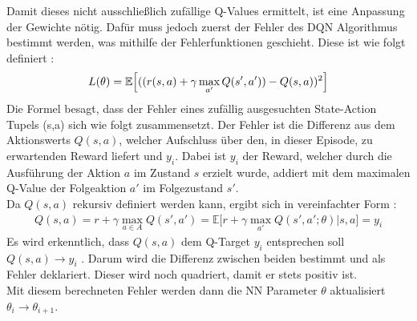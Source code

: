 Damit dieses nicht ausschließlich zufällige Q-Values ermittelt, ist eine Anpassung der Gewichte nötig. Dafür muss jedoch zuerst der Fehler des DQN Algorithmus bestimmt werden, was mithilfe der Fehlerfunktionen geschieht. Diese ist wie folgt definiert \citep[S.146 f.]{DRL_Lapan}:
\begin{align}
	L(\theta) = \mathbb{E} \Bigl\lbrack ((r(s,a) +\gamma \max_{a'}Q(s',a')) - Q(s,a))^2 \Bigr\rbrack
	\label{eq:DQN_Loss}
\end{align}
Die Formel  besagt, dass der Fehler eines zufällig ausgesuchten State-Action Tupels (s,a) sich wie folgt zusammensetzt. 
Der Fehler ist die Differenz aus dem Aktionswerts $Q(s,a)$, welcher Aufschluss über den, in dieser Episode, zu erwartenden Reward liefert und $y_i$. Dabei ist $y_i$ der Reward, welcher durch die Ausführung der Aktion $a$ im Zustand $s$ erzielt wurde, addiert mit dem maximalen Q-Value der Folgeaktion $a'$ im Folgezustand $s'$.\\
Da $Q(s,a)$ rekursiv definiert werden kann, ergibt sich in vereinfachter Form \citep[S.126 und S. 146 f.]{DRL_Lapan}:
\begin{align}
	Q(s,a) = r + \gamma \max_{a \in A}Q(s',a') = \mathbb{E} \bigl\lbrack r+\gamma \max_{a'}Q(s',a';\theta)|s,a \bigr\rbrack = y_i
	\label{eq:Q-Value_rekursive_def}
\end{align}
Es wird erkenntlich, dass $Q(s,a)$ dem Q-Target $y_i$ entsprechen soll $Q(s,a) \longrightarrow y_i$ . Darum wird die Differenz zwischen beiden bestimmt und als Fehler deklariert. Dieser wird noch quadriert, damit er stets positiv ist. \\
Mit diesem berechneten Fehler werden dann die NN Parameter $\theta$ aktualisiert $\theta_{i} \longrightarrow \theta_{i+1}$.

